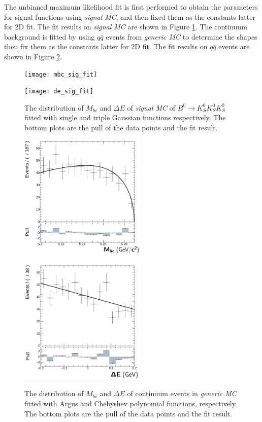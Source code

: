 The unbinned maximum likelihood fit is first performed to obtain the parameters for signal functions using \textit{signal MC}, and then fixed them as the constants latter for 2D fit. The fit results on \textit{signal MC} are shown in Figure \ref{fig:mbcde1D}. The continuum background is fitted by using $q\bar{q}$ events from \textit{generic MC} to determine the shapes then fix them as the constants latter for 2D fit. The fit results on \textit{$q\bar{q}$} events are shown in Figure \ref{fig:bkgmbcde}.
 \begin{figure}[htbp]
 	\begin{minipage}[b]{0.5\linewidth}
 		\centering 
 		\texttt{[image: mbc\_sig\_fit]}
 	\end{minipage}
 	\begin{minipage}[b]{0.5\linewidth}
 		\centering 
 		\texttt{[image: de\_sig\_fit]}
 	\end{minipage}
 	\caption{The distribution of $M_{bc}$ and $\Delta E$ of \textit{signal MC} of $B^0 \to K_S^0  K_S^0  K_S^0$ fitted with single and triple Gaussian functions respectively. The bottom plots are the pull of the data points and the fit result.}
 	\label{fig:mbcde1D}
 \end{figure}
\begin{figure}[htbp]
	\begin{minipage}[b]{0.5\linewidth}
		\centering 
		\includegraphics[height=6cm]{figures/mbc_cs_fit}
		\label{}
	\end{minipage}
	\begin{minipage}[b]{0.5\linewidth}
		\centering 
		\includegraphics[height=6cm]{figures/de_cs_fit}
		\label{}
	\end{minipage}
	\caption{The distribution of $M_{bc}$ and $\Delta E$ of continuum events in \textit{generic MC} fitted with Argus and Chebyshev polynomial functions, respectively.  The bottom plots are the pull of the data points and the fit result.}
	\label{fig:bkgmbcde}
\end{figure}

